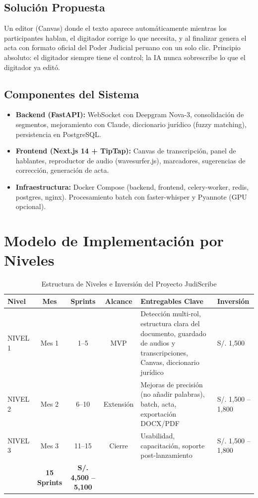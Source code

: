 \documentclass[12pt,a4paper]{report}
\begin{document}
\subsection{Solución Propuesta}

Un editor (Canvas) donde el texto aparece automáticamente mientras los participantes hablan, el digitador corrige lo que necesita, y al finalizar genera el acta con formato oficial del Poder Judicial peruano con un solo clic. Principio absoluto: el digitador siempre tiene el control; la IA nunca sobrescribe lo que el digitador ya editó.

\subsection{Componentes del Sistema}

\begin{itemize}
    \item \textbf{Backend (FastAPI):} WebSocket con Deepgram Nova-3, consolidación de segmentos, mejoramiento con Claude, diccionario jurídico (fuzzy matching), persistencia en PostgreSQL.
    \item \textbf{Frontend (Next.js 14 + TipTap):} Canvas de transcripción, panel de hablantes, reproductor de audio (wavesurfer.js), marcadores, sugerencias de corrección, generación de acta.
    \item \textbf{Infraestructura:} Docker Compose (backend, frontend, celery-worker, redis, postgres, nginx). Procesamiento batch con faster-whisper y Pyannote (GPU opcional).
\end{itemize}

\section{Modelo de Implementación por Niveles}

\begin{table}[H]
\centering
\begin{tabular}{|l|c|c|c|p{4.8cm}|p{2.8cm}|}
\hline
\rowcolor{primaryblue!20}
\textbf{Nivel} & \textbf{Mes} & \textbf{Sprints} & \textbf{Alcance} & \textbf{Entregables Clave} & \textbf{Inversión} \\
\hline
NIVEL 1 & Mes 1 & 1--5 & MVP & Detección multi-rol, estructura clara del documento, guardado de audios y transcripciones, Canvas, diccionario jurídico & S/. 1,500 \\
\hline
NIVEL 2 & Mes 2 & 6--10 & Extensión & Mejoras de precisión (no añadir palabras), batch, acta, exportación DOCX/PDF & S/. 1,500 -- 1,800 \\
\hline
NIVEL 3 & Mes 3 & 11--15 & Cierre & Usabilidad, capacitación, soporte post-lanzamiento & S/. 1,500 -- 1,800 \\
\hline
\rowcolor{secondarygreen!20}
\multicolumn{4}{|r|}{\textbf{Sistema completo:}} & \textbf{15 Sprints} & \textbf{S/. 4,500 -- 5,100} \\
\hline
\end{tabular}
\caption{Estructura de Niveles e Inversión del Proyecto JudiScribe}
\end{table}
\end{document}

